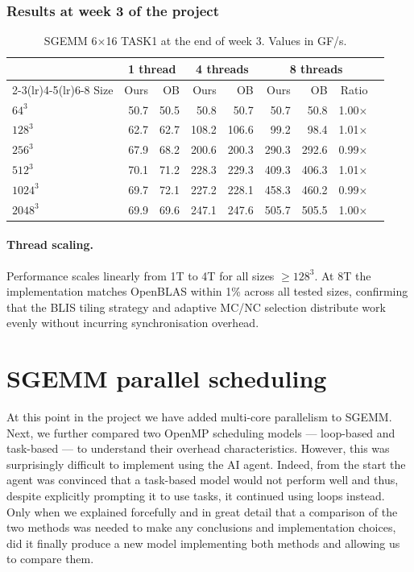 \documentclass[11pt,a4paper]{article}
\begin{document}
\subsubsection{Results at week 3 of the project}

\begin{table}[h]
\centering
\caption{SGEMM 6$\times$16 TASK1 at the end of week 3. Values in GF/s.}
\label{tab:week3}
\small
\begin{tabular}{lrrrrrrrr}
\toprule
& \multicolumn{2}{c}{1 thread} & \multicolumn{2}{c}{4 threads} & \multicolumn{3}{c}{8 threads}\\
\cmidrule(lr){2-3}\cmidrule(lr){4-5}\cmidrule(lr){6-8}
Size & Ours & OB & Ours & OB & Ours & OB & Ratio\\
\midrule
$64^3$   &  50.7 &  50.5 &  50.8 &  50.7 &  50.7 &  50.8 & 1.00$\times$\\
$128^3$  &  62.7 &  62.7 & 108.2 & 106.6 &  99.2 &  98.4 & 1.01$\times$\\
$256^3$  &  67.9 &  68.2 & 200.6 & 200.3 & 290.3 & 292.6 & 0.99$\times$\\
$512^3$  &  70.1 &  71.2 & 228.3 & 229.3 & 409.3 & 406.3 & 1.01$\times$\\
$1024^3$ &  69.7 &  72.1 & 227.2 & 228.1 & 458.3 & 460.2 & 0.99$\times$\\
$2048^3$ &  69.9 &  69.6 & 247.1 & 247.6 & 505.7 & 505.5 & 1.00$\times$\\
\bottomrule
\end{tabular}
\end{table}

\paragraph{Thread scaling.}
Performance scales linearly from 1T to 4T for all sizes $\ge 128^3$.
At 8T the implementation matches OpenBLAS within 1\% across all tested sizes,
confirming that the BLIS tiling strategy and adaptive MC/NC selection distribute
work evenly without incurring synchronisation overhead.

\section{SGEMM parallel scheduling}
\label{sec:parallel}

At this point in the project we have added multi-core parallelism to SGEMM. Next, we further compared two OpenMP scheduling models — loop-based and task-based — to understand their overhead characteristics. However, this was surprisingly difficult to implement using the AI agent. Indeed, from the start the agent was convinced that a task-based model would not perform well and thus, despite explicitly prompting it to use tasks, it continued using loops instead. Only when we explained forcefully and in great detail that a comparison of the two methods was needed to make any conclusions and implementation choices, did it finally produce a new model implementing both methods and allowing us to compare them.
\end{document}

